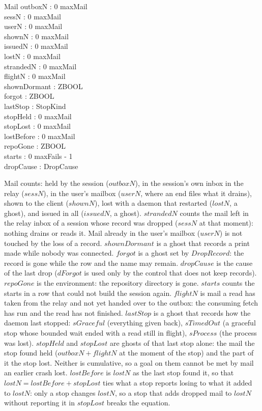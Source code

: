 \documentclass[a4paper,10pt,fleqn]{article}
\begin{document}
\begin{schema}{Mail}
  outboxN : 0 \upto maxMail \\
  sessN : 0 \upto maxMail \\
  userN : 0 \upto maxMail \\
  shownN : 0 \upto maxMail \\
  issuedN : 0 \upto maxMail \\
  lostN : 0 \upto maxMail \\
  strandedN : 0 \upto maxMail \\
  flightN : 0 \upto maxMail \\
  shownDormant : ZBOOL \\
  forgot : ZBOOL \\
  lastStop : StopKind \\
  stopHeld : 0 \upto maxMail \\
  stopLost : 0 \upto maxMail \\
  lostBefore : 0 \upto maxMail \\
  repoGone : ZBOOL \\
  starts : 0 \upto maxFails - 1 \\
  dropCause : DropCause
\end{schema}

Mail counts: held by the session ($outboxN$), in the session's own inbox in the
relay ($sessN$), in the user's mailbox ($userN$, where an end files what it
drains),
shown to the client ($shownN$), lost with a daemon that restarted ($lostN$, a
ghost), and issued in all ($issuedN$, a ghost).  $strandedN$ counts the mail left in the relay inbox of a session whose
record was dropped ($sessN$ at that moment): nothing drains or reads it.
Mail already in the user's mailbox ($userN$) is not touched by the loss of a
record.  $shownDormant$ is a ghost
that records a print made while nobody was connected.  $forgot$ is a ghost set by
$DropRecord$: the record is gone while the row and the name may remain.  $dropCause$ is the cause of the
last drop ($dForgot$ is used only by the control that does not keep records).  $repoGone$ is the
environment: the repository directory is gone.  $starts$ counts the starts in a row that could not
build the session again.
$flightN$ is mail a read has taken from the relay and not yet handed over to the
outbox: the consuming fetch has run and the read has not finished.  $lastStop$ is
a ghost that records how the daemon last stopped: $sGraceful$ (everything given
back), $sTimedOut$ (a graceful stop whose bounded wait ended with a read still in
flight), $sProcess$ (the process was lost).  $stopHeld$ and $stopLost$ are ghosts of that last
stop alone: the mail the stop found held ($outboxN + flightN$ at the moment of the stop) and the
part of it the stop lost.  Neither is cumulative, so a goal on them cannot be met by mail an
earlier crash lost.  $lostBefore$ is $lostN$ as the last stop found it, so that
$lostN = lostBefore + stopLost$ ties what a stop reports losing to what it added to
$lostN$: only a stop changes $lostN$, so a stop that adds dropped mail to $lostN$
without reporting it in $stopLost$ breaks the equation.
\end{document}
